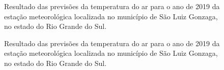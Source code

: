 \begin{figure}[H]%
\caption{Resultado das previsões da temperatura do ar para o ano de 2019 da estação meteorológica localizada no município de São Luiz Gonzaga, no estado do Rio Grande do Sul.}
\centering
{}
\qquad
{}
\label{fig:results_arima_A720}%
\end{figure}

\begin{figure}[H]%
\caption{Resultado das previsões da temperatura do ar para o ano de 2019 da estação meteorológica localizada no município de São Luiz Gonzaga, no estado do Rio Grande do Sul.}
\centering
{}
\qquad
{}
\label{fig:results_lstm_83464}%
\end{figure}

